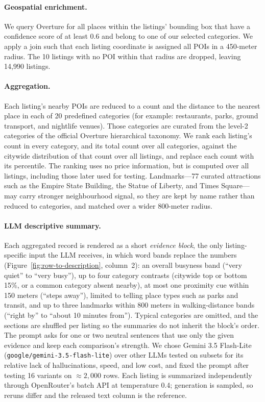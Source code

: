 \documentclass{article}
\begin{document}
\paragraph{Geospatial enrichment.} We query Overture for all places within the listings' bounding box
that have a confidence score of at least 0.6 and belong to one of our selected categories.
We apply a join such that each listing coordinate is assigned all POIs in a 450-meter radius.
The 10 listings with no POI within that radius are dropped, leaving 14,990 listings.

\paragraph{Aggregation.} Each listing's nearby POIs are reduced to a count and the distance to the nearest place in each of 20 predefined categories
(for example: restaurants, parks, ground transport, and nightlife venues).
Those categories are curated from the level-2 categories of the official Overture hierarchical taxonomy.
We rank each listing's count in every category, and its total count over all categories, against the citywide distribution of that count over all listings,
and replace each count with its percentile.
The ranking uses no price information, but is computed over all listings, including those later used for testing.
Landmarks---77 curated attractions such as the Empire State Building, the Statue of Liberty, and Times Square---may carry
stronger neighbourhood signal, so they are kept by name rather than reduced to categories, and matched over a wider 800-meter radius.

\paragraph{LLM descriptive summary.} Each aggregated record is rendered as a short \emph{evidence block},
the only listing-specific input the LLM receives, in which word bands replace the numbers
(Figure~\ref{fig:row-to-description}, column~2): an overall busyness band (``very quiet'' to ``very busy''),
up to four category contrasts (citywide top or bottom 15\%, or a common category absent nearby),
at most one proximity cue within 150 meters (``steps away''), limited to telling place types such as parks and transit,
and up to three landmarks within 800 meters in walking-distance bands (``right by'' to ``about 10 minutes from'').
Typical categories are omitted, and the sections are shuffled per listing so the summaries do not inherit
the block's order.
The prompt asks for one or two neutral sentences that use only the given evidence and keep each comparison's strength.
We chose Gemini 3.5 Flash-Lite \citep{gemini35flashlite} (\texttt{google/gemini-3.5-flash-lite}) over other LLMs
tested on subsets for its relative lack of hallucinations, speed, and low cost, and fixed the prompt after testing
16 variants on $\approx 2{,}000$ rows.
Each listing is summarized independently through OpenRouter's batch API at temperature 0.4;
generation is sampled, so reruns differ and the released text column is the reference.
\end{document}
